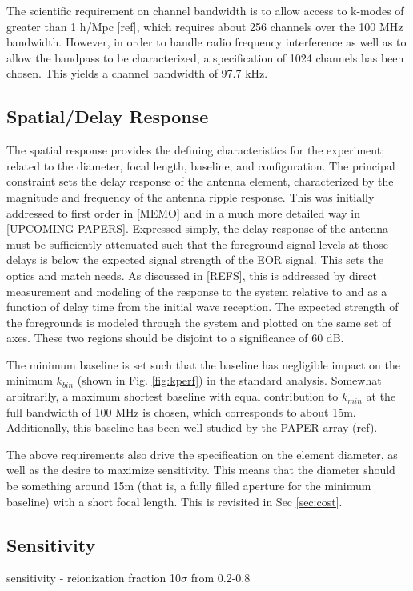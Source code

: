\documentclass{article}
\begin{document}
The scientific requirement on channel bandwidth is to allow access to k-modes of greater than 1 h/Mpc [ref], which requires about 256 channels over the 100 MHz bandwidth.  However, in order to handle radio frequency interference as well as to allow the bandpass to be characterized, a specification of 1024 channels has been chosen.  This yields a channel bandwidth of 97.7 kHz.


\subsection{Spatial/Delay Response}
The spatial response provides the defining characteristics for the experiment; related to the diameter, focal length, baseline, and configuration.  The principal constraint sets the delay response of the antenna element, characterized by the magnitude and frequency of the antenna ripple response.  This was initially addressed to first order in [MEMO] and in a much more detailed way in [UPCOMING PAPERS].  Expressed simply, the delay response of the antenna must be sufficiently attenuated such that the foreground signal levels at those delays is below the expected signal strength of the EOR signal.  This sets the optics and match needs.  As discussed in [REFS], this is addressed by direct measurement and modeling of the response to the system relative to and as a function of delay time from the initial wave reception.  The expected strength of the foregrounds is modeled through the system and plotted on the same set of axes.  These two regions should be disjoint to a significance of 60 dB.

The minimum baseline is set such that the baseline has negligible impact on the minimum $k_{bin}$ (shown in Fig. \ref{fig:kperf}) in the standard analysis.  Somewhat arbitrarily, a maximum shortest baseline with equal contribution to $k_{min}$ at the full bandwidth of 100 MHz is chosen, which corresponds to about 15m.  Additionally, this baseline has been well-studied by the PAPER array (ref).

The above requirements also drive the specification on the element diameter, as well as the desire to maximize sensitivity.  This means that the diameter should be something around 15m (that is, a fully filled aperture for the minimum baseline) with a short focal length.  This is revisited in Sec \ref{sec:cost}.

\subsection{Sensitivity}
sensitivity - reionization fraction 10$\sigma$ from 0.2-0.8
\end{document}
